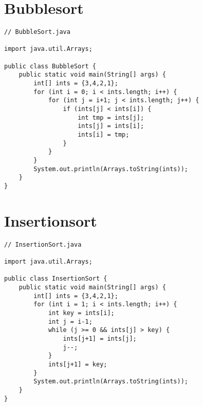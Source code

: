 \section{Bubblesort}
\begin{center}
\end{center}
\pagebreak
\begin{center}  
\begin{lstlisting}
// BubbleSort.java

import java.util.Arrays;

public class BubbleSort {
    public static void main(String[] args) {
        int[] ints = {3,4,2,1};
        for (int i = 0; i < ints.length; i++) {
            for (int j = i+1; j < ints.length; j++) {
                if (ints[j] < ints[i]) {
                    int tmp = ints[j];
                    ints[j] = ints[i];
                    ints[i] = tmp;
                }
            }
        }
        System.out.println(Arrays.toString(ints));
    }
}
\end{lstlisting}
\end{center}

\section{Insertionsort}
\begin{center}
\begin{lstlisting}
// InsertionSort.java

import java.util.Arrays;

public class InsertionSort {
    public static void main(String[] args) {
        int[] ints = {3,4,2,1};
        for (int i = 1; i < ints.length; i++) {
            int key = ints[i];
            int j = i-1;
            while (j >= 0 && ints[j] > key) {
                ints[j+1] = ints[j];
                j--;
            }
            ints[j+1] = key;
        }
        System.out.println(Arrays.toString(ints));
    }
}
\end{lstlisting}
\end{center}

